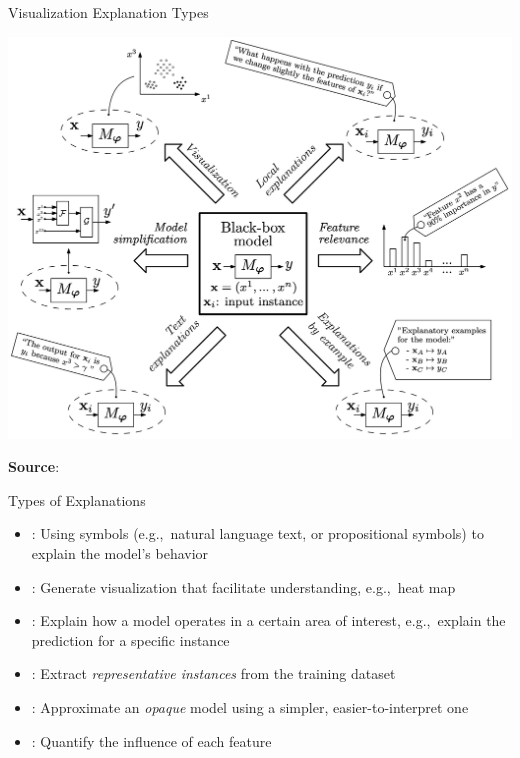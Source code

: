 \documentclass[11pt,dvipsnames,usenames,aspectratio=169]{beamer}  %
\begin{document}
\begin{frame}{Visualization Explanation Types}
  \begin{center}
    \includegraphics[scale=0.177]{visual_representation_explanation_types.png}
  \end{center}
  \begin{flushright}
    {\vspace{-16pt} \tiny \textbf{Source}:~\citep{Arrieta:2020}}
  \end{flushright}
\end{frame}

\begin{frame}{Types of Explanations}{}
  {\small
    \begin{itemize}[<+->]
      \setlength{\itemsep}{14pt}
      \item \textbf{}: Using symbols (e.g.,~natural language text, or propositional symbols) to explain the model's behavior
      \item \textbf{}: Generate visualization that facilitate understanding, e.g.,~heat map
      \item \textbf{}: Explain how a model operates in a certain area of interest, e.g.,~explain the prediction for a specific instance
      \item \textbf{}: Extract \textit{representative instances} from the training dataset
      \item \textbf{}: Approximate an \textit{opaque} model using a simpler, easier-to-interpret one
      \item \textbf{}: Quantify the influence of each feature
    \end{itemize}
  }
\end{frame}
\end{document}
